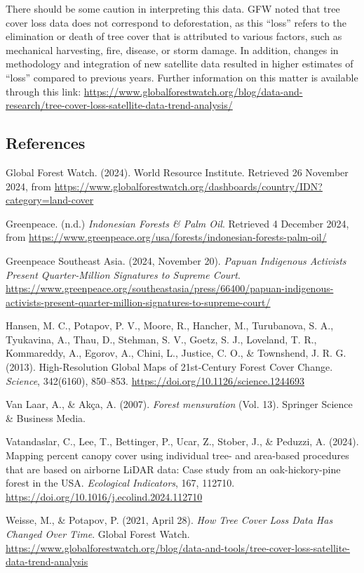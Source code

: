 \documentclass[
]{article}
\begin{document}
There should be some caution in interpreting this data. GFW noted that
tree cover loss data does not correspond to deforestation, as this
``loss'' refers to the elimination or death of tree cover that is
attributed to various factors, such as mechanical harvesting, fire,
disease, or storm damage. In addition, changes in methodology and
integration of new satellite data resulted in higher estimates of
``loss'' compared to previous years. Further information on this matter
is available through this link:
\url{https://www.globalforestwatch.org/blog/data-and-research/tree-cover-loss-satellite-data-trend-analysis/}

\subsection{References}\label{references}

Global Forest Watch. (2024). World Resource Institute. Retrieved 26
November 2024, from
\url{https://www.globalforestwatch.org/dashboards/country/IDN?category=land-cover}

Greenpeace. (n.d.) \emph{Indonesian Forests \& Palm Oil}. Retrieved 4
December 2024, from
\url{https://www.greenpeace.org/usa/forests/indonesian-forests-palm-oil/}

Greenpeace Southeast Asia. (2024, November 20). \emph{Papuan Indigenous
Activists Present Quarter-Million Signatures to Supreme Court}.
\url{https://www.greenpeace.org/southeastasia/press/66400/papuan-indigenous-activists-present-quarter-million-signatures-to-supreme-court/}

Hansen, M. C., Potapov, P. V., Moore, R., Hancher, M., Turubanova, S.
A., Tyukavina, A., Thau, D., Stehman, S. V., Goetz, S. J., Loveland, T.
R., Kommareddy, A., Egorov, A., Chini, L., Justice, C. O., \& Townshend,
J. R. G. (2013). High-Resolution Global Maps of 21st-Century Forest
Cover Change. \emph{Science}, 342(6160), 850--853.
\url{https://doi.org/10.1126/science.1244693}

Van Laar, A., \& Akça, A. (2007). \emph{Forest mensuration} (Vol. 13).
Springer Science \& Business Media.

Vatandaslar, C., Lee, T., Bettinger, P., Ucar, Z., Stober, J., \&
Peduzzi, A. (2024). Mapping percent canopy cover using individual tree-
and area-based procedures that are based on airborne LiDAR data: Case
study from an oak-hickory-pine forest in the USA. \emph{Ecological
Indicators}, 167, 112710.
\url{https://doi.org/10.1016/j.ecolind.2024.112710}

Weisse, M., \& Potapov, P. (2021, April 28). \emph{How Tree Cover Loss
Data Has Changed Over Time}. Global Forest Watch.
\url{https://www.globalforestwatch.org/blog/data-and-tools/tree-cover-loss-satellite-data-trend-analysis}
\end{document}
